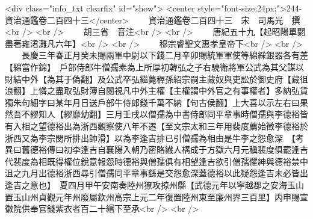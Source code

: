 <div class="info_txt clearfix" id="show">
<center style="font-size:24px;">244-資治通鑑卷二百四十三</center>
  　　資治通鑑卷二百四十三　宋　司馬光　撰<br />
<br />
　　胡三省　音注<br />
<br />
　　唐紀五十九【起昭陽單閼盡著雍涒灘凡六年】<br />
<br />
　　穆宗睿聖文惠孝皇帝下<br />
<br />
　　長慶三年春正月癸未賜兩軍中尉以下錢二月辛卯賜統軍軍使等綿綵銀器各有差【綿當作錦】　戶部侍郎牛僧孺素為上所厚初韓弘之子右驍衛將軍公武為其父謀以財結中外【為其于偽翻】及公武卒弘繼薨稺孫紹宗嗣主藏奴與吏訟於御史府【藏徂浪翻】上憐之盡取弘財簿自閱視凡中外主權【主權謂中外官之有事權者】多納弘貨獨朱句細字曰某年月日送戶部牛侍郎錢千萬不納【句古侯翻】上大喜以示左右曰果然吾不繆知人【繆靡幼翻】三月壬戌以僧孺為中書侍郎同平章事時僧孺與李德裕皆有入相之望德裕出為浙西觀察使八年不遷【至文宗太和三年用裴度薦始徵李德裕於浙西又為李宗閔所排出帥滑】以為李逢吉排已引僧孺為相由是牛李之怨愈深　【考異曰舊德裕傳曰初李逢吉自襄陽入朝乃密賂纎人構成于方獄六月元稹裴度俱罷逢吉代裴度為相既得權位銳意報怨時德裕與僧孺俱有相望逢吉欲引僧孺懼紳與德裕禁中沮之九月出德裕浙西尋引僧孺同平章事繇是交怨愈深蓋德裕以此疑怨逢吉未必皆出逢吉之意也】　夏四月甲午安南奏陸州獠攻掠州縣【武德元年以寜越郡之安海玉山置玉山州貞觀元年州廢屬欽州高宗上元二年復置陸州東至廉州界三百里】丙申賜宣徽院供奉官錢紫衣者百二十緡下至承<br />
<br />
